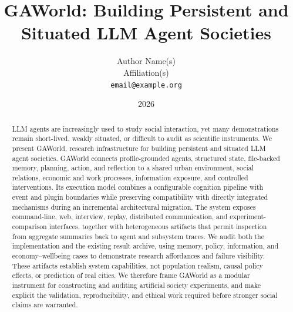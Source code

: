\documentclass[10pt]{article}
\title{GAWorld: Building Persistent and Situated LLM Agent Societies}
\author{Author Name(s)\\Affiliation(s)\\\texttt{email@example.org}}
\date{2026}
\begin{document}
\maketitle

\begin{abstract}
LLM agents are increasingly used to study social interaction, yet many
demonstrations remain short-lived, weakly situated, or difficult to audit as
scientific instruments.  We present GAWorld, research infrastructure for
building persistent and situated LLM agent societies.  GAWorld connects
profile-grounded agents, structured state, file-backed memory, planning,
action, and reflection to a shared urban environment, social relations,
economic and work processes, information exposure, and controlled
interventions.  Its execution model combines a configurable cognition
pipeline with event and plugin boundaries while preserving compatibility with
directly integrated mechanisms during an incremental architectural migration.
The system exposes command-line, web, interview, replay, distributed
communication, and experiment-comparison interfaces, together with
heterogeneous artifacts that permit inspection from aggregate summaries back
to agent and subsystem traces.  We audit both the implementation and the
existing result archive, using memory, policy, information, and
economy--wellbeing cases to demonstrate research affordances and failure
visibility.  These artifacts establish system capabilities, not population
realism, causal policy effects, or prediction of real cities.  We therefore
frame GAWorld as a modular instrument for constructing and auditing artificial
society experiments, and make explicit the validation, reproducibility, and
ethical work required before stronger social claims are warranted.
\end{abstract}
















\end{document}
